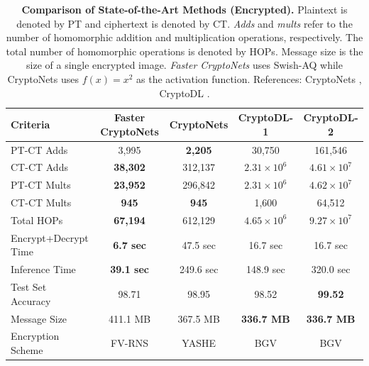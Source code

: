 \documentclass[conference]{IEEEtran}
\begin{document}
\begin{table}[!htbp]
\centering
\small
\begin{tabular}{l|c|ccc}
    \toprule
    Criteria & Faster CryptoNets & CryptoNets & CryptoDL-1 & CryptoDL-2  \\ \midrule
    PT-CT Adds & 3,995 & \textbf{2,205} & 30,750 & 161,546\\
    CT-CT Adds & \textbf{38,302} & 312,137 & $2.31 \times 10^6$ & $4.61 \times 10^7$  \\
    PT-CT Mults & \textbf{23,952} & 296,842 & $2.31 \times 10^6$ & $4.62 \times 10^7$  \\
    CT-CT Mults & \textbf{945} & \textbf{945} & 1,600 & 64,512 \\
    Total HOPs & \textbf{67,194} & 612,129 & $4.65 \times 10^6$ & $9.27 \times 10^7$ \\  \midrule
    Encrypt+Decrypt Time & \textbf{6.7 sec} & 47.5 sec & 16.7 sec & 16.7 sec \\
    Inference Time & \textbf{39.1 sec} & 249.6 sec & 148.9 sec & 320.0 sec \\ \midrule
    Test Set Accuracy & 98.71 & 98.95 & 98.52 & \textbf{99.52} \\
    Message Size & 411.1 MB & 367.5 MB & \textbf{336.7 MB} & \textbf{336.7 MB} \\ 
    Encryption Scheme & FV-RNS & YASHE & BGV & BGV \\ 
    \bottomrule
\end{tabular}
\vspace{-1mm}
\caption{\textbf{Comparison of State-of-the-Art Methods (Encrypted).} Plaintext is denoted by PT and ciphertext is denoted by CT. \textit{Adds} and \textit{mults} refer to the number of homomorphic addition and multiplication operations, respectively. The total number of homomorphic operations is denoted by HOPs. Message size is the size of a single encrypted image. %
\textit{Faster CryptoNets} uses Swish-AQ while  CryptoNets uses $f(x)=x^2$ as the activation function. References: CryptoNets \cite{gilad2016cryptonets}, CryptoDL \cite{hesamifard2017cryptodl}.}
\label{table:sota}
\end{table}
\end{document}
